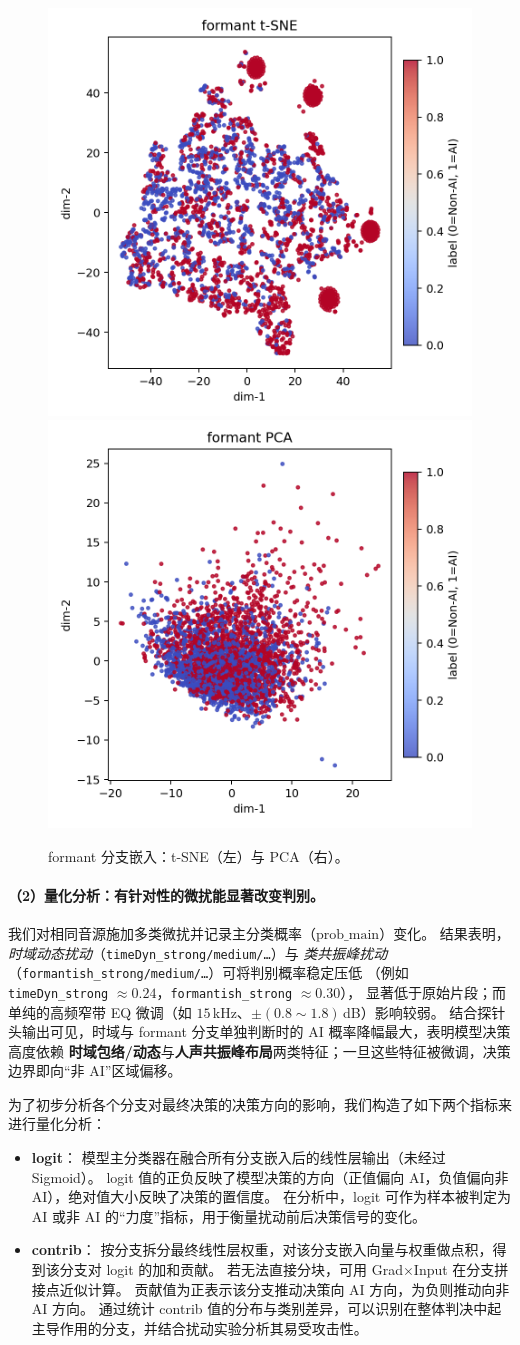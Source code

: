 \documentclass[a4paper,12pt]{article}
\begin{document}
\begin{figure}[H]
  \centering
  \includegraphics[width=.4\linewidth]{images_in_paper/embed_formant_tsne.png}
  \includegraphics[width=.4\linewidth]{images_in_paper/embed_formant_pca.png}
  \caption{formant 分支嵌入：t-SNE（左）与 PCA（右）。}
  \label{fig:formant_tsne}
  \label{fig:formant_pca}
\end{figure}

\paragraph{（2）量化分析：有针对性的微扰能显著改变判别。}
我们对相同音源施加多类微扰并记录主分类概率（$\mathrm{prob\_main}$）变化。
结果表明，\emph{时域动态扰动}（\texttt{timeDyn\_strong/medium/\ldots}）与
\emph{类共振峰扰动}（\texttt{formantish\_strong/medium/\ldots}）可将判别概率稳定压低
（例如 \texttt{timeDyn\_strong} $\approx 0.24$，\texttt{formantish\_strong} $\approx 0.30$），
显著低于原始片段；而单纯的高频窄带 EQ 微调（如 $15$\,kHz、$\pm(0.8\!\sim\!1.8)$\,dB）影响较弱。
结合探针头输出可见，时域与 formant 分支单独判断时的 AI 概率降幅最大，表明模型决策高度依赖
\textbf{时域包络/动态}与\textbf{人声共振峰布局}两类特征；一旦这些特征被微调，决策边界即向“非 AI”区域偏移。

为了初步分析各个分支对最终决策的决策方向的影响，我们构造了如下两个指标来进行量化分析：
\begin{itemize}
  \item \textbf{logit}：
  模型主分类器在融合所有分支嵌入后的线性层输出（未经过 Sigmoid）。
  logit 值的正负反映了模型决策的方向（正值偏向 AI，负值偏向非 AI），绝对值大小反映了决策的置信度。
  在分析中，logit 可作为样本被判定为 AI 或非 AI 的“力度”指标，用于衡量扰动前后决策信号的变化。

  \item \textbf{contrib}：
  按分支拆分最终线性层权重，对该分支嵌入向量与权重做点积，得到该分支对 logit 的加和贡献。
  若无法直接分块，可用 Grad$\times$Input 在分支拼接点近似计算。
  贡献值为正表示该分支推动决策向 AI 方向，为负则推动向非 AI 方向。
  通过统计 contrib 值的分布与类别差异，可以识别在整体判决中起主导作用的分支，并结合扰动实验分析其易受攻击性。
\end{itemize}
\end{document}
